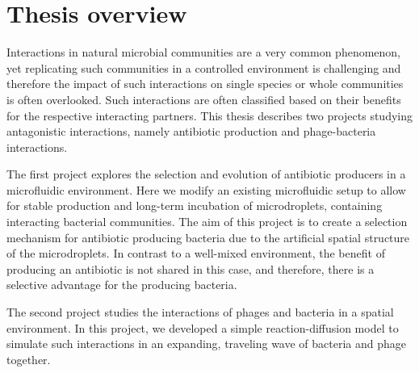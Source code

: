 \chapter*{Thesis overview}
Interactions in natural microbial communities are a very common phenomenon, yet replicating such communities in a controlled environment is challenging and therefore the impact of such interactions on single species or whole communities is often overlooked. Such interactions are often classified based on their benefits for the respective interacting partners. This thesis describes two projects studying antagonistic interactions, namely antibiotic production and phage-bacteria interactions. 

The first project explores the selection and evolution of antibiotic producers in a microfluidic environment. Here we modify an existing microfluidic setup to allow for stable production and long-term incubation of microdroplets, containing interacting bacterial communities. The aim of this project is to create a selection mechanism for antibiotic producing bacteria due to the artificial spatial structure of the microdroplets. In contrast to a well-mixed environment, the benefit of producing an antibiotic is not shared in this case, and therefore, there is a selective advantage for the producing bacteria. 

The second project studies the interactions of phages and bacteria in a spatial environment. In this project, we developed a simple reaction-diffusion model to simulate such interactions in an expanding, traveling wave of bacteria and phage together. 